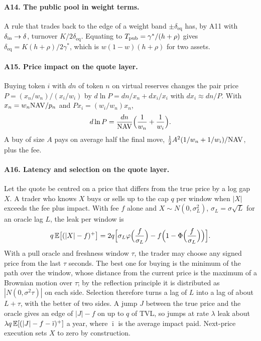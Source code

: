 \paragraph{A14. The public pool in weight terms.} A rule that trades back to the edge of a weight band $\pm\delta_{\mathrm{eq}}$ has, by A11 with $\delta_{\mathrm{in}}\to\delta$, turnover $K/2\delta_{\mathrm{eq}}$. Equating to $T_{\mathrm{pub}}=\gamma^{*}/(h+\rho)$ gives $\delta_{\mathrm{eq}}=K(h+\rho)/2\gamma^{*}$, which is $w(1-w)(h+\rho)$ for two assets.

\paragraph{A15. Price impact on the quote layer.} Buying token $i$ with $dn$ of token $n$ on virtual reserves changes the pair price $P=(x_n/w_n)/(x_i/w_i)$ by $d\ln P=dn/x_n+dx_i/x_i$ with $dx_i\approx dn/P$. With $x_n=w_n\mathrm{NAV}/p_n$ and $Px_i=(w_i/w_n)x_n$,
\begin{equation}
d\ln P=\frac{dn}{\mathrm{NAV}}\Big(\frac1{w_n}+\frac1{w_i}\Big).
\end{equation}
A buy of size $A$ pays on average half the final move, $\tfrac12A^2(1/w_n+1/w_i)/\mathrm{NAV}$, plus the fee.

\paragraph{A16. Latency and selection on the quote layer.} Let the quote be centred on a price that differs from the true price by a log gap $X$. A trader who knows $X$ buys or sells up to the cap $q$ per window when $|X|$ exceeds the fee plus impact. With fee $f$ alone and $X\sim N(0,\sigma_L^2)$, $\sigma_L=\sigma\sqrt{L}$ for an oracle lag $L$, the leak per window is
\begin{equation}
q\,\mathbb{E}\big[(|X|-f)^+\big]=2q\Big[\sigma_L\varphi\Big(\frac{f}{\sigma_L}\Big)-f\Big(1-\Phi\Big(\frac{f}{\sigma_L}\Big)\Big)\Big].
\end{equation}
With a pull oracle and freshness window $\tau$, the trader may choose any signed price from the last $\tau$ seconds. The best one for buying is the minimum of the path over the window, whose distance from the current price is the maximum of a Brownian motion over $\tau$; by the reflection principle it is distributed as $|N(0,\sigma^2\tau)|$ on each side. Selection therefore turns a lag of $L$ into a lag of about $L+\tau$, with the better of two sides. A jump $J$ between the true price and the oracle gives an edge of $|J|-f$ on up to $q$ of TVL, so jumps at rate $\lambda$ leak about $\lambda q\,\mathbb{E}[(|J|-f-\bar\imath)^+]$ a year, where $\bar\imath$ is the average impact paid. Next-price execution sets $X$ to zero by construction.

